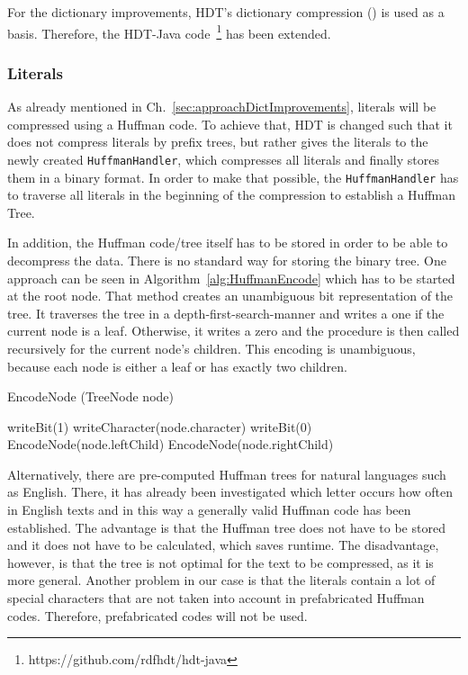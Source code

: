 For the dictionary improvements, HDT's dictionary compression (\DHDT{}) is used as a basis. Therefore, the HDT-Java code~\footnote{https://github.com/rdfhdt/hdt-java} has been extended.

\subsubsection{Literals}\label{sec:implementationLiterals}

As already mentioned in Ch.~\ref{sec:approachDictImprovements}, literals will be compressed using a Huffman code. To achieve that, HDT is changed such that it does not compress literals by prefix trees, but rather gives the literals to the newly created {\tt HuffmanHandler}, which compresses all literals and finally stores them in a binary format. In order to make that possible, the {\tt HuffmanHandler} has to traverse all literals in the beginning of the compression to establish a Huffman Tree.

In addition, the Huffman code/tree itself has to be stored in order to be able to decompress the data. There is no standard way for storing the binary tree. One approach can be seen in Algorithm~\ref{alg:HuffmanEncode} which has to be started at the root node. That method creates an unambiguous bit representation of the tree. It traverses the tree in a depth-first-search-manner and writes a one if the current node is a leaf. Otherwise, it writes a zero and the procedure is then called recursively for the current node's children. This encoding is unambiguous, because each node is either a leaf or has exactly two children.

\begin{algorithm}
	\caption{EncodeNode (TreeNode node)}\label{alg:HuffmanEncode}
	\begin{algorithmic}[1]
		\State writeBit(1)
		\State writeCharacter(node.character)
		\Else
		\State writeBit(0)
		\State EncodeNode(node.leftChild)
		\State EncodeNode(node.rightChild)
		\EndIf
	\end{algorithmic}
\end{algorithm}


Alternatively, there are pre-computed Huffman trees for natural languages such as English. There, it has already been investigated which letter occurs how often in English texts and in this way a generally valid Huffman code has been established. The advantage is that the Huffman tree does not have to be stored and it does not have to  be calculated, which saves runtime. The disadvantage, however, is that the tree is not optimal for the text to be compressed, as it is more general. Another problem in our case is that the literals contain a lot of special characters that are not taken into account in prefabricated Huffman codes. Therefore, prefabricated codes will not be used.

